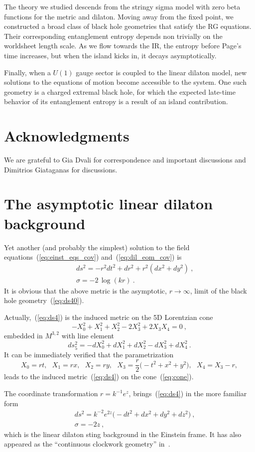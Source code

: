 \documentclass[a4paper, 12pt]{article}
\def\be{\begin{equation}}
\def\ee{\end{equation}}
\def\bea{\begin{eqnarray}}
\def\eea{\end{eqnarray}}
\begin{document}
The theory we studied descends from the stringy sigma model  with zero beta functions for the metric and dilaton. Moving away from the fixed point, we constructed a broad class of black hole geometries that satisfy the RG equations. Their corresponding entanglement entropy depends non trivially on the worldsheet length scale. As we flow towards the IR, the entropy before Page's time increases, but when the island kicks in, it decays asymptotically. 

Finally, when  a $U(1)$ gauge sector is coupled to the linear dilaton model, new solutions to the equations of motion become accessible to the system. One such geometry is a charged extremal black hole, for which the expected late-time behavior  of its entanglement entropy is a result of an island contribution.  


\section*{Acknowledgments} 


We are grateful to Gia Dvali for correspondence and important discussions and Dimitrios Giataganas for discussions.  


\appendix


\section{ The asymptotic linear dilaton background}
\label{app:background}


Yet another (and probably the simplest) solution to the field equations~(\ref{eq:einst_eqs_cov}) and~(\ref{eq:dil_eom_cov}) is
\bea
&&d s^2=-r^2 dt^2 + d r^2+r^2\left(d x^2+d y^2\right) \ , \label{eq:ds4} \\
&&\sigma=-2\, \log (k r) \ . \label{eq:s}
 \eea
It is obvious that the above metric is the asymptotic, $r\to\infty$, limit of the black hole geometry~(\ref{eq:ds40}).

Actually,~(\ref{eq:ds4}) is  the induced metric on the 5D Lorentzian cone
\be
\label{eq:cone}
-X_0^2+X_1^2+X_2^2-2X_3^2+2 X_3 X_4=0 \ , 
\ee
embedded in $M^{3,2}$ with line element 
\be
d s_5^2= -d X_0^2+d X_1^2+d X_2^2 -d X_3^2+d X_4^2 \ .
\ee
It can be immediately verified that the  parametrization 
\be
X_0=rt,~~~X_1=rx,~~~X_2=ry,~~~X_3=\frac{r}{2}\Big(-t^2+x^2+y^2\Big),~~~X_4=X_3-r,
\ee
leads to the induced metric~(\ref{eq:ds4}) on the cone~(\ref{eq:cone}). 
 
The coordinate transformation $r=k^{-1} e^z$, brings~(\ref{eq:ds4}) in the more familiar form
\bea
&&d s^2=k^{-2}e^{2z}\Big(-dt^2+d x^2+d y^2+d z^2\Big) \ , \label{eq:conmetric}\\
&&\sigma =-2z \ ,
\eea 
which is the linear dilaton sting background in the Einstein frame. It has also appeared as the ``continuous clockwork
geometry'' in~\cite{Giudice1,Giudice2,KR1,KR2}.
\end{document}
